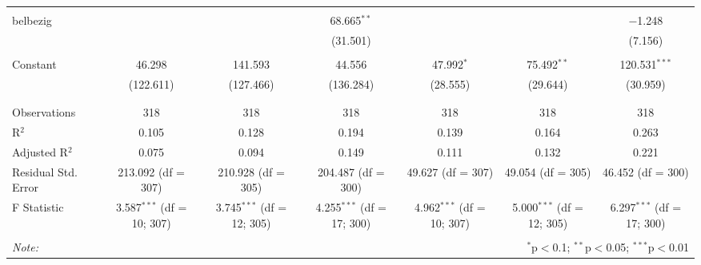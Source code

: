 \begin{table}[!htbp]
\begin{tabular}{@{\extracolsep{5pt}}lcccccc}
  & & & & & & \\ 
 belbezig &  &  & 68.665$^{**}$ &  &  & $-$1.248 \\ 
  &  &  & (31.501) &  &  & (7.156) \\ 
  & & & & & & \\ 
 Constant & 46.298 & 141.593 & 44.556 & 47.992$^{*}$ & 75.492$^{**}$ & 120.531$^{***}$ \\ 
  & (122.611) & (127.466) & (136.284) & (28.555) & (29.644) & (30.959) \\ 
  & & & & & & \\ 
\hline \\[-1.8ex] 
Observations & 318 & 318 & 318 & 318 & 318 & 318 \\ 
R$^{2}$ & 0.105 & 0.128 & 0.194 & 0.139 & 0.164 & 0.263 \\ 
Adjusted R$^{2}$ & 0.075 & 0.094 & 0.149 & 0.111 & 0.132 & 0.221 \\ 
Residual Std. Error & 213.092 (df = 307) & 210.928 (df = 305) & 204.487 (df = 300) & 49.627 (df = 307) & 49.054 (df = 305) & 46.452 (df = 300) \\ 
F Statistic & 3.587$^{***}$ (df = 10; 307) & 3.745$^{***}$ (df = 12; 305) & 4.255$^{***}$ (df = 17; 300) & 4.962$^{***}$ (df = 10; 307) & 5.000$^{***}$ (df = 12; 305) & 6.297$^{***}$ (df = 17; 300) \\ 
\hline 
\hline \\[-1.8ex] 
\textit{Note:}  & \multicolumn{6}{r}{$^{*}$p$<$0.1; $^{**}$p$<$0.05; $^{***}$p$<$0.01} \\ 
\end{tabular} 
\end{table} 
